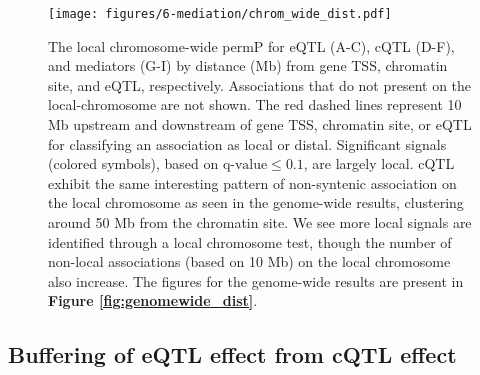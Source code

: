 \begin{figure}
\renewcommand{\familydefault}{\sfdefault}\normalfont
\centering
\texttt{[image: figures/6-mediation/chrom\_wide\_dist.pdf]}
\caption[Local chromosome-wide association signal increases as distance decreases from gene, chromatin region, and eQTL]{The local chromosome-wide permP for eQTL (A-C), cQTL (D-F), and mediators (G-I) by distance (Mb) from gene TSS, chromatin site, and eQTL, respectively. Associations that do not present on the local-chromosome are not shown. The red dashed lines represent 10 Mb upstream and downstream of gene TSS, chromatin site, or eQTL for classifying an association as local or distal. Significant signals (colored symbols), based on $\text{q-value} \le 0.1$, are largely local. cQTL exhibit the same interesting pattern of non-syntenic association on the local chromosome as seen in the genome-wide results, clustering around 50 Mb from the chromatin site. We see more local signals are identified through a local chromosome test, though the number of non-local associations (based on 10 Mb) on the local chromosome also increase. The figures for the genome-wide results are present in \textbf{Figure \ref{fig:genomewide_dist}}.
\label{fig:chrwide_dist}}
\end{figure}

\subsection{Buffering of eQTL effect from cQTL effect}


